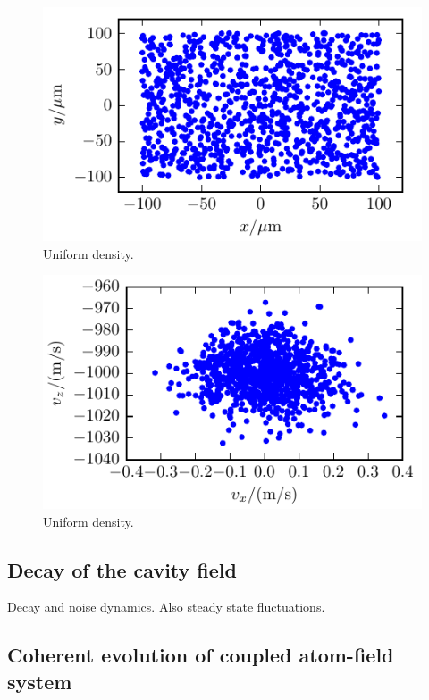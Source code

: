 \documentclass[aps, superscriptaddress, groupedaddress, preprint]{revtex4}
\begin{document}
\begin{figure}
\begin{center}
\includegraphics{ptcl_source/density.pdf}
\end{center}
\caption{Uniform density.}
\end{figure}

\begin{figure}
\begin{center}
\includegraphics{ptcl_source/velocity_distribution.pdf}
\end{center}
\caption{Uniform density.}
\end{figure}


\subsection{Decay of the cavity field}

Decay and noise dynamics.  Also steady state fluctuations.


\subsection{Coherent evolution of coupled atom-field system}
\end{document}
